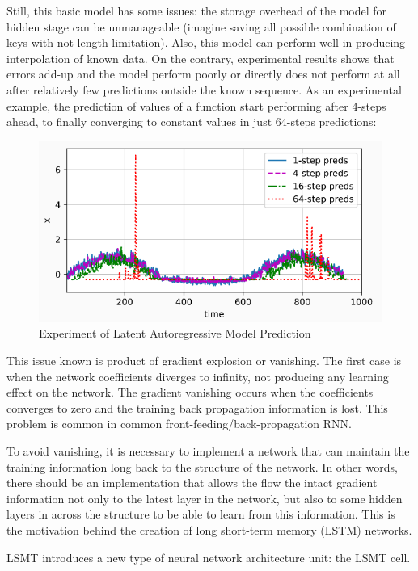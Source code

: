 Still, this basic model has some issues: the storage overhead of the model for hidden
stage can be unmanageable (imagine saving all possible combination of keys with not
length limitation). Also, this model can perform well in producing interpolation of known
data. On the contrary, experimental results shows that errors add-up and the model
perform poorly or directly does not perform at all after relatively few predictions outside
the known sequence. As an experimental example, the prediction of values of a
function start performing after 4-steps ahead, to finally converging to constant values
in just 64-steps predictions:

\begin{figure}[h!]
  \includegraphics[width=\linewidth]{image/fig_JDF13.png}
  \caption{Experiment of Latent Autoregressive Model Prediction}
\end{figure}


This issue known is product of gradient explosion or vanishing. The first case is when
the network coefficients diverges to infinity, not producing any learning effect on the
network. The gradient vanishing occurs when the coefficients converges to zero and
the training back propagation information is lost. This problem is common in common
front-feeding/back-propagation RNN.

To avoid vanishing, it is necessary to implement a network that can maintain the
training information long back to the structure of the network. In other words, there
should be an implementation that allows the flow the intact gradient information not
only to the latest layer in the network, but also to some hidden layers in across the
structure to be able to learn from this information. This is the motivation behind the
creation of long short-term memory (LSTM) networks.

LSMT introduces a new type of neural network architecture unit: the LSMT cell.

